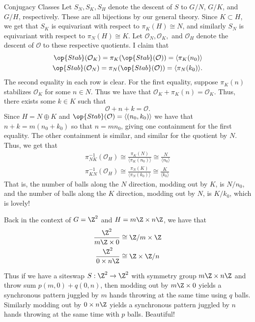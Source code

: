 \documentclass[12nt]{article}
\theoremstyle{plain}
\begin{document}
\begin{subsection}{Conjugacy Classes}
Let $S_N, S_K, S_H$ denote the descent of $S$ to $G/N$, $G/K$, and $G/H$, respectively. These are all bijections by our general theory. Since $K \subset H$, we get that $S_K$ is equivariant with respect to $\pi_K(H) \cong N$, and similarly $S_N$ is equivariant with respect to $\pi_N(H) \cong  K$. Let $\mathcal{O}_N, \mathcal{O}_K,$ and $\mathcal{O}_H$ denote the descent of $\mathcal{O}$ to these respective quotients. I claim that \begin{align*}
\op{Stab}(\mathcal{O}_K) = \pi_K(\op{Stab}(\mathcal{O})) = \langle \pi_K(n_0) \rangle \\
\op{Stab}(\mathcal{O}_N) = \pi_N(\op{Stab}(\mathcal{O})) = \langle \pi_N(k_0) \rangle.
\end{align*}
The second equality in each row is clear. For the first equality, suppose $\pi_K(n)$ stabilizes $\mathcal{O}_K$ for some $n \in N$. Thus we have that $\mathcal{O}_K + \pi_K(n) = \mathcal{O}_K$. Thus, there exists some $k \in K$ such that
\[
\mathcal{O} + n + k = \mathcal{O}.
\]
Since $H = N \oplus K$ and $\op{Stab}(\mathcal{O}) = \langle (n_0, k_0) \rangle$ we have that $n + k = m(n_0 + k_0)$ so that $n = mn_0$, giving one containment for the first equality. The other containment is similar, and similar for the quotient by $N$. Thus, we get that 
\begin{align*}
\pi_{NK}^{-1}(\mathcal{O}_H) \cong \frac{\pi_K(N)}{\langle \pi_K(n_0)\rangle } \cong \frac{N}{\langle n_0 \rangle} \\
\pi_{KN}^{-1}(\mathcal{O}_H) \cong \frac{\pi_N(K)}{\langle \pi_N(k_0)\rangle } \cong \frac{K}{\langle k_0\rangle }
\end{align*}
That is, the number of balls along the $N$ direction, modding out by $K$, is $N/n_0$, and the number of balls along the $K$ direction, modding out by $N$, is $K/k_0$, which is lovely!

Back in the context of $G = \Z^2$ and $H = m\Z \times n\Z$, we have that 
\begin{align*}
\frac{\Z^2}{m\Z \times 0} &\cong \Z/m \times \Z \\
\frac{\Z^2}{0 \times n\Z} &\cong \Z \times \Z/n
\end{align*}

Thus if we have a siteswap $S : \Z^2 \to \Z^2$ with symmetry group $m\Z \times n\Z$ and throw sum $p(m, 0) + q(0, n)$, then modding out by $m\Z \times 0$ yields a synchronous pattern juggled by $m$ hands throwing at the same time using $q$ balls. Similarly modding out by $0 \times n\Z$ yields a synchronous pattern juggled by $n$ hands throwing at the same time with $p$ balls. Beautiful!


\end{subsection}
\end{document}
